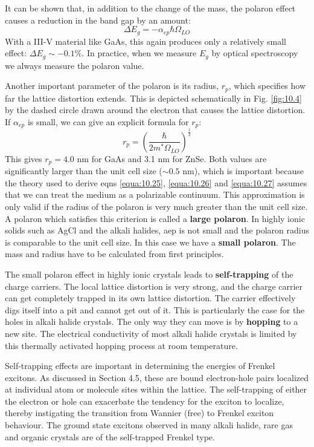 \documentclass[12pt]{book}
\begin{document}
It can be shown that, in addition to the change of the mass, the polaron effect causes a reduction in the band gap by an amount:
\begin{equation}\label{equa:10.26}
  \Delta E_g=-\alpha_{ep}\hbar\Omega_{LO}
\end{equation}
With a III-V material like GaAs, this again produces only a relatively small effect: $\Delta E_g\sim-0.1\%$. In practice, when we measure $E_g$ by optical spectroscopy we always measure the polaron value.

Another important parameter of the polaron is its radius, $r_p$, which specifies how far the lattice distortion extends. This is depicted schematically in Fig. \ref{fig:10.4} by the dashed circle drawn around the electron that causes the lattice distortion. If $\alpha_{ep}$ is small, we can give an explicit formula for $r_p$:
\begin{equation}\label{equa:10.27}
  r_p=\left(\frac{\hbar}{2m^*\Omega_{LO}}\right)^{\frac{1}{2}}
\end{equation}
This gives $r_p = 4.0$ nm for GaAs and 3.1 nm for ZnSe. Both values are significantly larger than the unit cell size ($\sim0.5$ nm), which is important because the theory used to derive eqns \ref{equa:10.25}, \ref{equa:10.26} and \ref{equa:10.27} assumes that we can treat the medium as a polarizable continuum. This approximation is only valid if the radius of the polaron is very much greater than the unit cell size. A polaron which satisfies this criterion is called a \textbf{large polaron}. In highly ionic solids such as AgCl and the alkali halides, aep is not small and the polaron radius is comparable to the unit cell size. In this case we have a \textbf{small polaron}. The mass and radius have to be calculated from first principles.

The small polaron effect in highly ionic crystals leads to \textbf{self-trapping} of the charge carriers. The local lattice distortion is very strong, and the charge carrier can get completely trapped in its own lattice distortion. The carrier effectively digs itself into a pit and cannot get out of it. This is particularly the case for the holes in alkali halide crystals. The only way they can move is by \textbf{hopping} to a new site. The electrical conductivity of most alkali halide crystals is limited by this thermally activated hopping process at room temperature.

Self-trapping effects are important in determining the energies of Frenkel excitons. As discussed in Section 4.5, these are bound electron-hole pairs localized at individual atom or molecule sites within the lattice. The self-trapping of either the electron or hole can exacerbate the tendency for the exciton to localize, thereby instigating the transition from Wannier (free) to Frenkel exciton behaviour. The ground state excitons observed in many alkali halide, rare gas and organic crystals are of the self-trapped Frenkel type.
\end{document}
